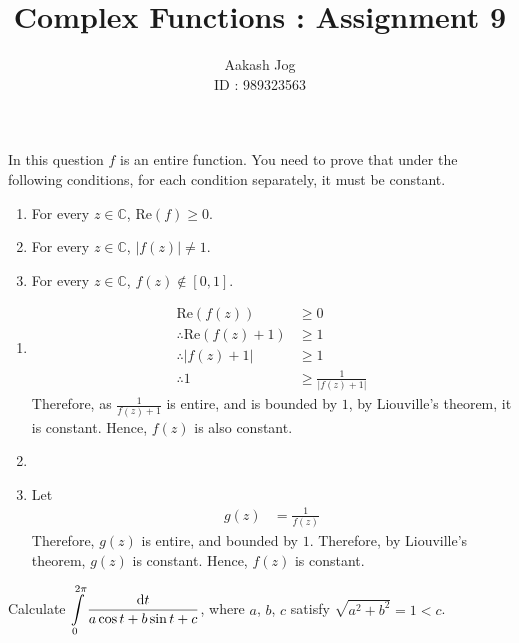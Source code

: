 \documentclass[fleqn, a4paper, 11pt, oneside]{amsart}
\title{Complex Functions : Assignment 9}
\author
{
	Aakash Jog\\
	ID : 989323563
}
\date{\formatdate{30}{12}{2015}}
\theoremstyle{definition}
\theoremstyle{theorem}
\renewcommand{\Re}{\mathrm{Re}}
\begin{document}

\maketitle

\setcounter{question}{2}
\begin{question}
	In this question $f$ is an entire function.
	You need to prove that under the following conditions, for each condition separately, it must be constant.
	\begin{enumerate}
		\item For every $z \in \mathbb{C}$, $\Re(f) \ge 0$.
		\item For every $z \in \mathbb{C}$, $\left| f(z) \right| \neq 1$.
		\item For every $z \in \mathbb{C}$, $f(z) \notin [0,1]$.
	\end{enumerate}
\end{question}

\begin{solution}
	\begin{enumerate}[leftmargin=*]
		\item
			\begin{align*}
				\Re(f(z)) &\ge 0\\
				\therefore \Re(f(z) + 1) &\ge 1\\
				\therefore \left| f(z) + 1 \right| &\ge 1\\
				\therefore 1 &\ge \frac{1}{\left| f(z) + 1 \right|}
			\end{align*}
			Therefore, as $\frac{1}{f(z) + 1}$ is entire, and is bounded by $1$, by Liouville's theorem, it is constant.
			Hence, $f(z)$ is also constant.
		\item
		\item
			Let
			\begin{align*}
				g(z) &= \frac{1}{f(z)}
			\end{align*}
			Therefore, $g(z)$ is entire, and bounded by $1$.
			Therefore, by Liouville's theorem, $g(z)$ is constant.
			Hence, $f(z)$ is constant.
	\end{enumerate}
\end{solution}

\setcounter{question}{3}
\begin{question}
	Calculate $\displaystyle \int\limits_{0}^{2 \pi} \frac{\dif t}{a \cos t + b \sin t + c}$, where $a$, $b$, $c$ satisfy $\sqrt{a^2 + b^2} = 1 < c$.
\end{question}
\end{document}
